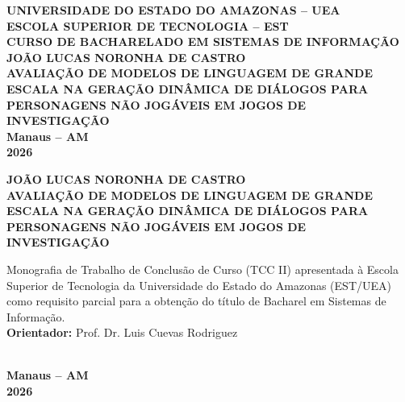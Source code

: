 \documentclass[12pt,a4paper,oneside]{report}
\begin{document}

\begin{titlepage}
\begin{center}
    {\large \textbf{UNIVERSIDADE DO ESTADO DO AMAZONAS -- UEA}}\\[0.2cm]
    {\large \textbf{ESCOLA SUPERIOR DE TECNOLOGIA -- EST}}\\[0.2cm]
    {\large \textbf{CURSO DE BACHARELADO EM SISTEMAS DE INFORMAÇÃO}}\\[3.5cm]

    {\large \textbf{JOÃO LUCAS NORONHA DE CASTRO}}\\[3.5cm]

    {\Large \textbf{AVALIAÇÃO DE MODELOS DE LINGUAGEM DE GRANDE ESCALA NA GERAÇÃO DINÂMICA DE DIÁLOGOS PARA PERSONAGENS NÃO JOGÁVEIS EM JOGOS DE INVESTIGAÇÃO}}\\[4.0cm]

    \vfill
    {\large \textbf{Manaus -- AM}}\\[0.2cm]
    {\large \textbf{2026}}
\end{center}
\end{titlepage}

\newpage
\begin{center}
    {\large \textbf{JOÃO LUCAS NORONHA DE CASTRO}}\\[4.0cm]

    {\Large \textbf{AVALIAÇÃO DE MODELOS DE LINGUAGEM DE GRANDE ESCALA NA GERAÇÃO DINÂMICA DE DIÁLOGOS PARA PERSONAGENS NÃO JOGÁVEIS EM JOGOS DE INVESTIGAÇÃO}}\\[2.5cm]

    \hfill
    \begin{minipage}{0.55\textwidth}
        \linespread{1.1}\selectfont
        \small
        Monografia de Trabalho de Conclusão de Curso (TCC II) apresentada à Escola Superior de Tecnologia da Universidade do Estado do Amazonas (EST/UEA) como requisito parcial para a obtenção do título de Bacharel em Sistemas de Informação.\\[0.5cm]
        \textbf{Orientador:} Prof. Dr. Luis Cuevas Rodriguez
    \end{minipage}\\[4.0cm]

    \vfill
    {\large \textbf{Manaus -- AM}}\\[0.2cm]
    {\large \textbf{2026}}
\end{center}
\end{document}
